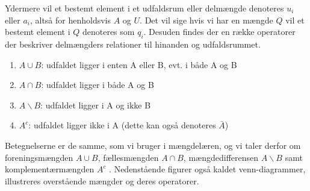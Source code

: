 \documentclass[../../SRP.tex]{subfiles}
\begin{document}
Ydermere vil et bestemt element i et udfaldsrum eller delmængde denoteres $u_i$ eller $a_i$, altså for henholdsvis $A$ og $U$. Det vil sige hvis vi har en mængde $Q$ vil et bestemt element i $Q$ denoteres som $q_i$. Desuden findes der en række operatorer der beskriver delmængders relationer til hinanden og udfaldsrummet.
\begin{enumerate}
  \item $A \cup B$: udfaldet ligger i enten A eller B, evt. i både A og B
  \item $A \cap B$: udfaldet ligger i både A og B
  \item $A \backslash B$: udfaldet ligger i A og ikke B
  \item $A^c$: udfaldet ligger ikke i A (dette kan også denoteres $\bar{A}$)
\end{enumerate}
Betegnelserne er de samme, som vi bruger i mængdelæren, og vi taler derfor om foreningsmængden $A \cup B$, fællesmængden $A \cap B$, mængdedifferensen $A \backslash B$ samt komplementærmængden $A^c$ \cite{SC}. Nedenstående figurer også kaldet venn-diagrammer, illustreres overstående mængder og deres operatorer.

\def\firstcircle{(0,0) circle (1.5cm)}
\def\secondcircle{(0:2cm) circle (1.5cm)}



\begin{center}
\qquad
\end{center}
\end{document}
